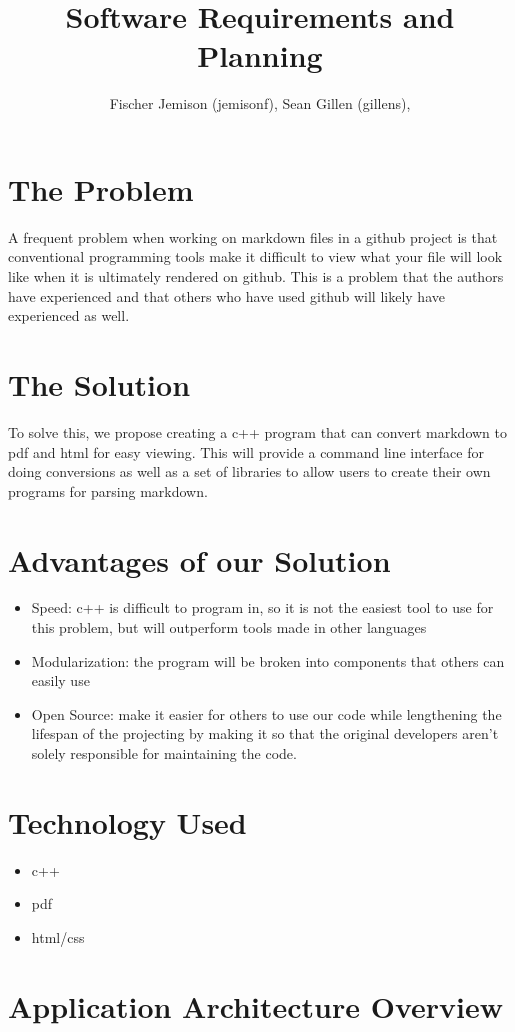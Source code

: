 \documentclass[12pt]{article}
\title{Software Requirements  and Planning}
\author{Fischer Jemison (jemisonf), Sean Gillen (gillens), }
\begin{document}
\maketitle
\tableofcontents


\section{The Problem}
A frequent problem when working on markdown files in a github project is that conventional programming tools make it difficult to view what your file will look like when it is ultimately rendered on github. This is a problem that the authors have experienced and that others who have used github will likely have experienced as well.
\section{The Solution}
To solve this, we propose creating a c++ program that can convert markdown to pdf and html for easy viewing. This will provide a command line interface for doing conversions as well as a set of libraries to allow users to create their own programs for parsing markdown.
\section{Advantages of our Solution}
\begin{itemize}
	\item Speed: c++ is difficult to program in, so it is not the easiest tool to use for this problem, but will outperform tools made in other languages
	\item Modularization: the program will be broken into components that others can easily use
	\item Open Source: make it easier for others to use our code while lengthening the lifespan of the projecting by making it so that the original developers aren't solely responsible for maintaining the code.
\end{itemize}
\section{Technology Used}
\begin{itemize}
	\item c++ 
	\item pdf
	\item html/css
\end{itemize}
\section{Application Architecture Overview}
\end{document}
